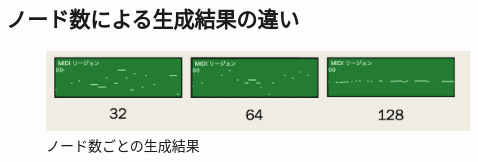 \subsection{ノード数による生成結果の違い}
\begin{figure}[h]
    \begin{screen}
    \begin{center}
        \includegraphics[scale=0.68, clip]{./img/nodo.png}
        \caption{ノード数ごとの生成結果}
        \label{fig:ノード数ごとの生成結果}
    \end{center}
    \end{screen}
\end{figure}
\newpage

